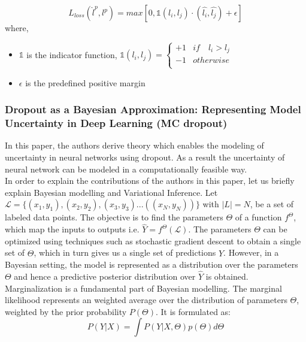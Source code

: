 \begin{equation}
    \label{equation:learning_loss_pair_wise_loss}
    L_{loss}(\hat{l}^{p}, l^{p}) = max [0, \mathbb{1}(l_i, l_j)\cdot(\hat{l_i}, \hat{l_j}) + \epsilon ]
\end{equation}
where,
\begin{itemize}[label={}]
  \setlength\itemsep{0em}
  \item $\mathbb{1}$ is the indicator function, $\mathbb{1}(l_i, l_j) = \begin{cases} 
      +1 & if \quad l_i > l_j \\
      -1 & otherwise \\
   \end{cases}$
   \item $\epsilon$ is the predefined positive margin
\end{itemize}

\subsubsection{Dropout as a Bayesian Approximation: Representing Model Uncertainty in Deep Learning\cite{gal2016}\cite{gal2016phd} (MC dropout)}
In this paper, the authors derive theory which enables the modeling of uncertainty in neural networks using dropout\cite{srivastava2014}. As a result the uncertainty of neural network can be modeled in a computationally feasible way. \\
In order to explain the contributions of the authors in this paper, let us briefly explain Bayesian modelling and Variational Inference. Let $\mathcal{L} = \{(x_1, y_1), (x_2, y_2), (x_3, y_3) ... ((x_N, y_N))\}$ with $|L| = N$, be a set of labeled data points. The objective is to find the parameters $\Theta$ of a function $f^\Theta$, which map the inputs to outputs i.e. $\hat{Y} = f^\Theta(\mathcal{L})$. The parameters $\Theta$ can be optimized using techniques such as stochastic gradient descent to obtain a single set of $\Theta$, which in turn gives us a single set of predictions $\hat{Y}$. However, in a Bayesian setting, the model is represented as a distribution over the parameters $\Theta$ and hence a predictive posterior distribution over $\hat{Y}$ is obtained. Marginalization is a fundamental part of Bayesian modelling. The marginal likelihood represents an weighted average over the distribution of parameters $\Theta$, weighted by the prior probability $P(\Theta)$. It is formulated as:
\begin{equation}
    \label{equation:marginal_likelihood_mc_dropout}
    P(Y | X) = \int P(Y | X, \Theta) p(\Theta) d\Theta
\end{equation}

